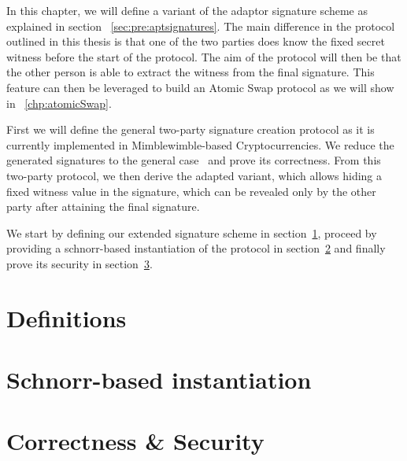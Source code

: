 In this chapter, we will define a variant of the adaptor signature scheme as explained in section ~\ref{sec:pre:aptsignatures}.
The main difference in the protocol outlined in this thesis is that one of the two parties does know the fixed secret witness before the start of the protocol.
The aim of the protocol will then be that the other person is able to extract the witness from the final signature.
This feature can then be leveraged to build an Atomic Swap protocol as we will show in ~\ref{chp:atomicSwap}.


First we will define the general two-party signature creation protocol as it is currently implemented in Mimblewimble-based Cryptocurrencies.
We reduce the generated signatures to the general case~\cite{schnorr1989efficient} and prove its correctness.
From this two-party protocol, we then derive the adapted variant, which allows hiding a fixed witness value in the signature, which can be revealed only by the other party after attaining the final signature.


We start by defining our extended signature scheme in section~\ref{sec:sig:definitions}, proceed by providing a schnorr-based instantiation of the protocol in section~\ref{sec:sig:schnorr-inst} and finally prove its security in section~\ref{sec:sig:two-party-apt-security}.


\section{Definitions} \label{sec:sig:definitions}


\section{Schnorr-based instantiation} \label{sec:sig:schnorr-inst}


\section{Correctness \& Security}\label{sec:sig:two-party-apt-security}

